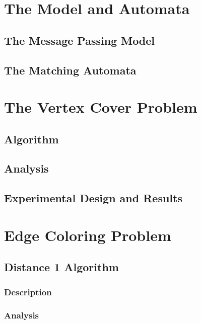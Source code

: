 \documentclass[twoside]{article}
\begin{document}
\section{The Model and Automata}
\label{sec:framework}
\subsection{The Message Passing Model}

\subsection{The Matching Automata}


\section{The Vertex Cover Problem}
\subsection{Algorithm}


\subsection{Analysis}


\subsection{Experimental Design and Results}



\section{Edge Coloring Problem}
\label{sec:edge-coloring-problems}
\subsection{Distance 1 Algorithm}
\subsubsection{Description}


\subsubsection{Analysis}

\end{document}
